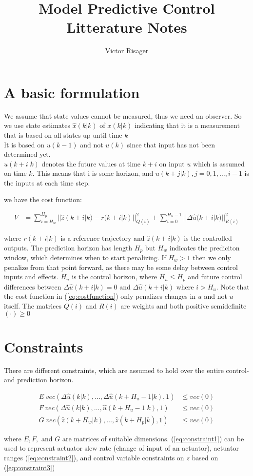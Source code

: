 \documentclass[a4paper]{article}
\title{Model Predictive Control\\
	\large Litterature Notes}
\author{Victor Risager}
\begin{document}
\maketitle

\section{A basic formulation}
We assume that state values cannot be measured, thus we need an observer. So we use state estimates 
$ \hat{x}(k|k) $ of $ x(k|k) $ indicating that it is a measurement that is based on all states up until time $ k $ \\
It is based on $ u(k-1) $ and not $ u(k) $ since that input has not been determined yet. \\
$ \hat{u}(k+i|k) $ denotes the future values at time $ k + i $ on input $ u $ which is assumed on time $ k $. This means that i is some horizon, and  $ u(k+j|k) , j = 0,1, \ldots, i-1 $ is the inputs at each time step.


we have the cost function:

\begin{align} \label{eq:costfunction}
V &= \sum_{i=H_w}^{H_p}{|| \hat{z}(k+i|k) - r(k+i|k)||_{Q(i)}^{2} } + \sum_{i = 0}^{H_u - 1}{|| \Delta \hat{u}(k+i|k)||_{R(i)}^{2} }
\end{align}

where $ r(k+i|k) $ is a reference trajectory and $ \hat{z}(k+i|k) $ is the controlled outputs. The prediction horizon has length $ H_p $ but $ H_w $ indicates the prediciton window, which determines when to start penalizing. If $ H_w > 1 $ then we only penalize from that point forward, as there may be some delay between control inputs and effects. $ H_u $ is the control horizon, where $ H_u \leq H_p $ and future control differences between $ \Delta \hat{u}(k+i|k) = 0 $ and $ \Delta \hat{u}(k+i|k) $ where $ i > H_u $. Note that the cost function in (\ref{eq:costfunction}) only penalizes changes in $ u $ and not  $ u $ itself. The matrices $ Q(i) $ and $ R(i) $ are weights and both positive semidefinite $ (\cdot) \geq 0$ 

\section{Constraints}
There are different constraints, which are assumed to hold over the entire control- and prediction horizon.

\begin{align}
	E \hspace{3pt} vec( \Delta \hat{u}(k|k), \ldots, \Delta \hat{u}(k+H_u - 1|k), 1) &\leq vec(0) \label{eq:constraint1} \\ 
	F \hspace{3pt} vec( \Delta \hat{u}(k|k), \ldots, \hat{u}(k+H_u - 1|k), 1) &\leq vec(0) \label{eq:constraint2}\\
	G \hspace{3pt} vec( \hat{z}(k+H_w | k) , \ldots, \hat{z}(k+H_p|k), 1) &\leq vec(0) \label{eq:constraint3}
\end{align}

where $ E, F, $ and $ G $ are matrices of suitable dimensions. (\ref{eq:constraint1}) can be used to represent actuator slew rate (change of input of an actuator), actuator ranges (\ref{eq:constraint2}), and control variable constraints on $ z $ based on (\ref{eq:constraint3}) 
\end{document}
